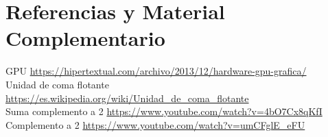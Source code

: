 \documentclass[10pt,a4paper]{article}
\begin{document}
%

\section{Referencias y Material Complementario}	

GPU  \url{https://hipertextual.com/archivo/2013/12/hardware-gpu-grafica/}\\
Unidad de coma flotante  \url{https://es.wikipedia.org/wiki/Unidad_de_coma_flotante}\\
Suma complemento a 2 \url{https://www.youtube.com/watch?v=4bO7Cx8qKfI}\\
Complemento a 2  \url{https://www.youtube.com/watch?v=umCFglE_eFU}\\

%
%
\end{document}

